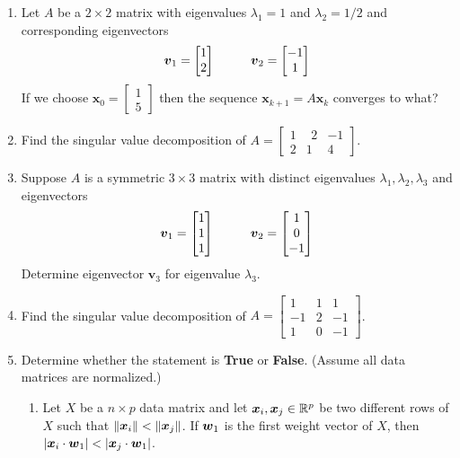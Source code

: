 \begin{enumerate}[leftmargin=*]
\begin{enumerate}
\end{enumerate}
\item Let $ A $ be a $ 2 \times 2 $ matrix with eigenvalues $ \lambda_1 = 1 $ and $ \lambda_2 = 1/2 $ and corresponding eigenvectors
\[ \boldsymbol{v}_1 = \begin{bmatrix} 1 \\ 2 \end{bmatrix} \hspace{10mm} \boldsymbol{v}_2 = \begin{bmatrix} -1 \\ 1 \end{bmatrix} \]
If we choose $ \boldsymbol{x}_0 = \begin{bmatrix} 1 \\ 5 \end{bmatrix} $ then the sequence $ \boldsymbol{x}_{k+1} = A \boldsymbol{x}_k $ converges to what?
\item Find the singular value decomposition of $\displaystyle A = \left[ \begin{array}{rrr} 1 & \ \, 2 & -1 \\ 2 & 1 & 4 \end{array} \right]$.
\item Suppose $ A $ is a symmetric $ 3 \times 3 $ matrix with distinct eigenvalues $ \lambda_1 , \lambda_2 , \lambda_3 $ and eigenvectors
\[ \boldsymbol{v}_1 = \begin{bmatrix} 1 \\ 1 \\ 1 \end{bmatrix} \hspace{10mm} \boldsymbol{v}_2 = \begin{bmatrix} 1 \\ 0 \\ -1 \end{bmatrix} \]
Determine eigenvector $ \boldsymbol{v}_3 $ for eigenvalue $ \lambda_3 $.
\item Find the singular value decomposition of $ \displaystyle A = \left[ \begin{array}{rrr} 1 & 1 & 1 \\ -1 & 2 & -1 \\ 1 & 0 & -1 \end{array} \right] $.
\item Determine whether the statement is {\bf True} or {\bf False}. (Assume all data matrices are normalized.)
\begin{enumerate}
\item Let $X$ be a $n \times p$ data matrix and let $\boldsymbol{x}_i , \boldsymbol{x}_j \in \mathbb{R}^p$ be two different rows of $X$ such that $\| \boldsymbol{x}_i \| < \| \boldsymbol{x}_j \|$. If $\boldsymbol{w}_1$ is the first weight vector of $X$, then $| \boldsymbol{x}_i \cdot \boldsymbol{w}_1 | < | \boldsymbol{x}_j \cdot \boldsymbol{w}_1 |$.

\end{enumerate}
\end{enumerate}
